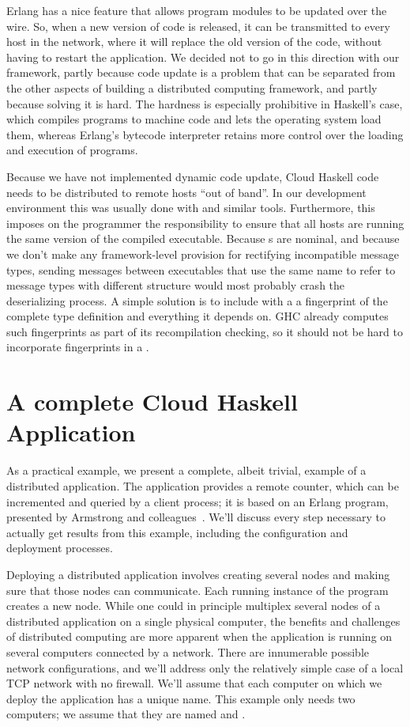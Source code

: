 \documentclass{sigplanconf}
\begin{document}
Erlang has a nice feature that allows program modules to be updated over the wire. So, when a new version of code is released, it can be transmitted to every host in the network, where it will replace the old version of the code, without having to restart the application. We decided not to go in this direction with our framework, partly because code update is a problem that can be separated from the other aspects of building a distributed computing framework, and partly because solving it is hard. The hardness is especially prohibitive in Haskell's case, which compiles programs to machine code and lets the operating system load them, whereas Erlang's bytecode interpreter retains more control over the loading and execution of programs.

Because we have not implemented dynamic code update, Cloud Haskell code needs to be distributed to remote hosts ``out of band''. In our development environment this was usually done with  and similar tools. Furthermore, this imposes on the programmer the responsibility to ensure that all hosts are running the same version of the compiled executable.  Because s are nominal, and because we don't make any framework-level provision for rectifying incompatible message types, sending messages between executables that use the same name to refer to message types with different structure would most probably crash the deserializing process.  A simple solution is to include with a  a fingerprint of the complete type definition and everything it depends on.  GHC already computes such fingerprints as part of its recompilation checking, so it should not be hard to incorporate fingerprints in a .


\section{A complete Cloud Haskell Application}
\label{s:completeApp}
As a practical example, we present a complete, albeit trivial, example of a distributed application. 
The application provides a remote counter, which can be incremented and queried by a client process; it is based on an Erlang program, presented by Armstrong and colleagues~\cite{Erlang93}. 
We'll discuss every step necessary to actually get results from this example, including the configuration and deployment processes.

Deploying a distributed application involves creating several nodes and making sure that those nodes can communicate. Each running instance of the program creates a new node. While one could in principle multiplex several nodes of a distributed application on a single physical computer, the benefits and challenges of distributed computing are more apparent when the application is running on several computers connected by a network. There are innumerable possible network configurations, and we'll address only the relatively simple case of a local TCP network with no firewall. We'll assume that each computer on which we deploy the application has a unique name. This example only needs two computers; we assume that they are named  and .
\end{document}
